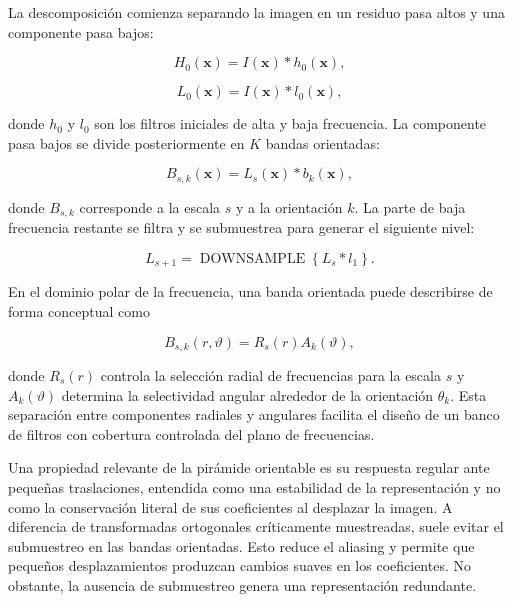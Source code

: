 La descomposición comienza separando la imagen en un residuo pasa altos y una componente pasa bajos:

\begin{equation}
    H_0(\mathbf{x})
    =
    I(\mathbf{x})*h_0(\mathbf{x}),
\end{equation}

\begin{equation}
    L_0(\mathbf{x})
    =
    I(\mathbf{x})*l_0(\mathbf{x}),
\end{equation}

donde $h_0$ y $l_0$ son los filtros iniciales de alta y baja frecuencia. La componente pasa bajos se divide posteriormente en $K$ bandas orientadas:

\begin{equation}
    B_{s,k}(\mathbf{x})
    =
    L_s(\mathbf{x})
    *
    b_k(\mathbf{x}),
    \label{eq:subbanda_orientada}
\end{equation}

donde $B_{s,k}$ corresponde a la escala $s$ y a la orientación $k$. La parte de baja frecuencia restante se filtra y se submuestrea para generar el siguiente nivel:

\begin{equation}
    L_{s+1}
    =
    \operatorname{DOWNSAMPLE}
    \left\{
        L_s*l_1
    \right\}.
    \label{eq:reduccion_steerable}
\end{equation}

En el dominio polar de la frecuencia, una banda orientada puede describirse de forma conceptual como

\begin{equation}
    B_{s,k}(r,\vartheta)
    =
    R_s(r)A_k(\vartheta),
    \label{eq:filtro_radial_angular}
\end{equation}

donde $R_s(r)$ controla la selección radial de frecuencias para la escala $s$ y $A_k(\vartheta)$ determina la selectividad angular alrededor de la orientación $\theta_k$. Esta separación entre componentes radiales y angulares facilita el diseño de un banco de filtros con cobertura controlada del plano de frecuencias.

Una propiedad relevante de la pirámide orientable es su respuesta regular ante pequeñas traslaciones, entendida como una estabilidad de la representación y no como la conservación literal de sus coeficientes al desplazar la imagen. A diferencia de transformadas ortogonales críticamente muestreadas, suele evitar el submuestreo en las bandas orientadas. Esto reduce el \gls{aliasing} y permite que pequeños desplazamientos produzcan cambios suaves en los coeficientes. No obstante, la ausencia de submuestreo genera una representación redundante.

